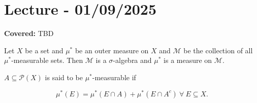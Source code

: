 \documentclass{functionspaces}
\begin{document}
\endgroup


\newpage
\section{Lecture - 01/09/2025}

\textbf{Covered:} TBD

\begingroup
\setlength{\parskip}{6pt}
\setlength{\parindent}{0pt}

\begin{theorem}
Let $X$ be a set and $\mu^{*}$ be an outer measure on $X$ and $\mathcal{M}$ be the collection of all $\mu^{*}$-measurable sets. Then $\mathcal{M}$ is a $\sigma$-algebra and $\mu^{*}$ is a measure on $\mathcal{M}$.

$A \subseteq \mathcal{P}(X)$ is said to be $\mu^{*}$-measurable if

\[
\mu^{*}(E) = \mu^{*}(E \cap A) + \mu^{*}(E \cap A^{c}) \ \forall\ E \subseteq X.
\]
\end{theorem}
\end{document}
